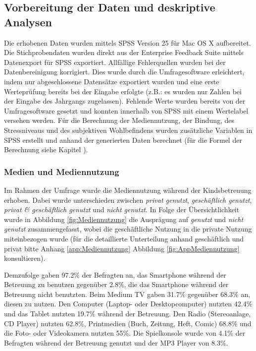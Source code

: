 \subsection{Vorbereitung der Daten und deskriptive Analysen}
Die erhobenen Daten wurden mittels SPSS Version 25 für Mac OS X aufbereitet. Die Stichprobendaten wurden direkt aus der Enterprise Feedback Suite \cite{Questback2018} mittels Datenexport für SPSS exportiert. Allfällige Fehlerquellen wurden bei der Datenbereinigung korrigiert. Dies wurde durch die Umfragesoftware erleichtert, indem nur abgeschlossene Datensätze exportiert wurden und eine erste Werteprüfung bereits bei der Eingabe erfolgte (z.B.: es wurden nur Zahlen bei der Eingabe des Jahrgangs zugelassen). Fehlende Werte wurden bereits von der Umfragesoftware gesetzt und konnten innerhalb von SPSS mit einem Wertelabel versehen werden. Für die Berechnung der Mediennutzung, der Bindung, des Stressniveaus und des subjektiven Wohlbefindens wurden zusätzliche Variablen in SPSS erstellt und anhand der generierten Daten berechnet (für die Formel der Berechnung siehe Kapitel ).

\subsubsection{Medien und Mediennutzung}
Im Rahmen der Umfrage wurde die Mediennutzung während der Kindsbetreuung erhoben. Dabei wurde unterschieden zwischen \textit{privat genutzt}, \textit{geschäftlich genutzt}, \textit{privat \& geschäftlich genutzt} und \textit{nicht genutzt}. In Folge der Übersichtlichkeit wurde in Abbildung \ref{fig:Mediennutzung} die Ausprägung auf \textit{genutzt} und \textit{nicht genutzt} zusammengefasst, wobei die geschäftliche Nutzung in die private Nutzung miteinbezogen wurde (für die detaillierte Unterteilung anhand geschäftlich und privat bitte Anhang \ref{app:Mediennutzung} Abbildung \ref{fig:AppMediennutzung} konsultieren).

Demzufolge gaben 97.2\% der Befragten an, das Smartphone während der Betreuung zu benutzen gegenüber 2.8\%, die das Smartphone während der Betreuung nicht benutzten. Beim Medium TV gaben 31.7\% gegenüber 68.3\% an, diesen zu nutzen. Den Computer (Laptop- oder Desktopcomputer) nutzten 42.4\% und das Tablet nutzten 19.7\% während der Betreuung. Den Radio (Stereoanlage, CD Player) nutzten 62.8\%, Printmedien (Buch, Zeitung, Heft, Comic) 68.8\% und die Foto- oder Videokamera nutzten 55\%. Die Spielkonsole wurde von 4.1\% der Befragten während der Betreuung genutzt und der MP3 Player von 8.3\%.

